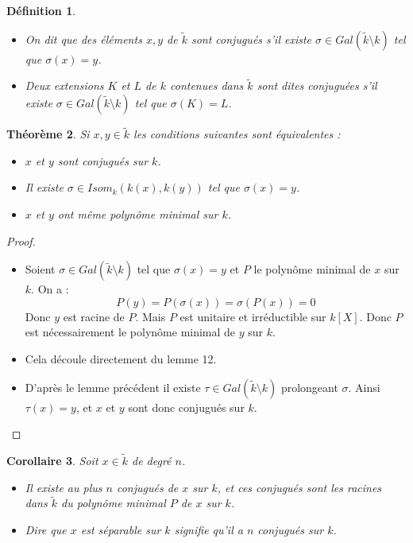 \documentclass[12pt,a4paper]{report}
\newtheorem{thm}{\bf Th\'eor\`eme}
\newtheorem{defn}[thm]{\bf D\'efinition}
\newtheorem{cor}[thm]{\bf Corollaire}
\begin{document}
\begin{defn}\rm
\begin{itemize}
\item On dit que des éléments $x,y$ de $\tilde{k}$ sont conjugués s'il existe $\sigma \in Gal(\tilde{k}\setminus k)$ tel que $\sigma(x)=y$. 
\item Deux extensions $K$ et $L$ de $k$ contenues dans $\tilde{k}$ sont dites conjuguées s'il existe $\sigma \in Gal(\tilde{k}\setminus k)$ tel que $\sigma(K)=L$.
\end{itemize}

\end{defn}

\begin{thm}\rm
Si $x,y\in \tilde{k}$ les conditions suivantes sont équivalentes : 

\begin{itemize}
\item[1)] $x$ et $y$ sont conjugués sur $k$.
\item[2)] Il existe $\sigma \in Isom_k(k(x),k(y))$ tel que $\sigma(x)=y$. 
\item[3)] $x$ et $y$ ont même polynôme minimal sur $k$. 
\end{itemize}
\end{thm}

\begin{proof}
\begin{itemize}
\item[$1)\Rightarrow 3)$]Soient $\sigma \in Gal(\tilde{k}\setminus k)$ tel que $\sigma(x)=y$ et $P$ le polynôme minimal de $x$ sur $k$. On a : 
$$P(y)=P(\sigma(x))=\sigma(P(x))=0$$
Donc $y$ est racine de $P$. Mais $P$ est unitaire et irréductible sur $k[X]$. Donc $P$ est nécessairement le polynôme minimal de $y$ sur $k$. 
\item[$3) \Rightarrow 2)$]Cela découle directement du lemme 12. 
\item[$2)\Rightarrow 1)$] D'après le lemme précédent il existe $\tau \in Gal(\tilde{k}\setminus k)$ prolongeant $\sigma$. Ainsi $\tau(x)=y$, et $x$ et $y$ sont donc conjugués sur $k$. 
\end{itemize}
\end{proof}

\begin{cor}\rm
Soit $x \in \tilde{k}$ de degré $n$. 
\begin{itemize}
\item Il existe au plus $n$ conjugués de $x$ sur $k$, et ces conjugués sont les racines dans $\tilde{k}$ du polynôme minimal $P$ de $x$ sur $k$.
\item Dire que $x$ est séparable sur $k$ signifie qu'il a $n$ conjugués sur $k$.  
\end{itemize}
\end{cor}
\end{document}
